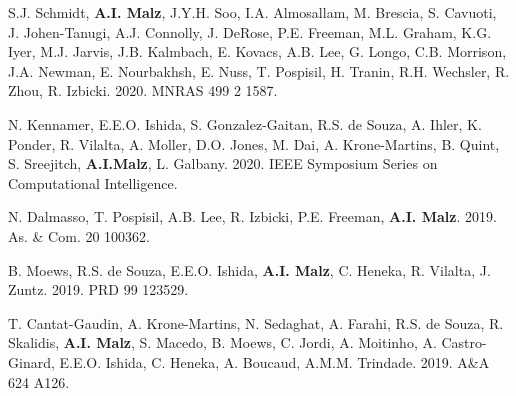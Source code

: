 \begin{list}{\pubnumber{\therefpubnum}}{\malzlist}
\item S.J. Schmidt, {\bf A.I. Malz}, J.Y.H. Soo, %
I.A. Almosallam, M. Brescia, S. Cavuoti, J. Johen-Tanugi, A.J. Connolly, J. DeRose, P.E. Freeman, M.L. Graham, K.G. Iyer, M.J. Jarvis, J.B. Kalmbach, E. Kovacs, A.B. Lee, G. Longo, C.B. Morrison, J.A. Newman, E. Nourbakhsh, E. Nuss, T. Pospisil, H. Tranin, R.H. Wechsler, R. Zhou, R. Izbicki. 
2020. MNRAS 499 2 1587. 

\item N. Kennamer, E.E.O. Ishida, S. Gonzalez-Gaitan, R.S. de Souza, A. Ihler, K. Ponder, R. Vilalta, A. Moller, D.O. Jones, M. Dai, A. Krone-Martins, B. Quint, S. Sreejitch, {\bf A.I.Malz}, L. Galbany. 2020. IEEE Symposium Series on
Computational Intelligence. 

\item N. Dalmasso, T. Pospisil, A.B. Lee, R. Izbicki, P.E. Freeman, {\bf A.I. Malz}. 2019. As. \& Com. 20 100362. 

\item B. Moews, R.S. de Souza, E.E.O. Ishida, {\bf A.I. Malz}, C. Heneka, R. Vilalta, J. Zuntz. 2019. PRD 99 123529. 

\item T. Cantat-Gaudin, A. Krone-Martins, N. Sedaghat, A. Farahi, R.S. de Souza, R. Skalidis, {\bf A.I. Malz}, S. Macedo, B. Moews, C. Jordi, A. Moitinho, A. Castro-Ginard, E.E.O. Ishida, C. Heneka, A. Boucaud, A.M.M. Trindade. 2019. A\&A 624 A126. 


\end{list}
